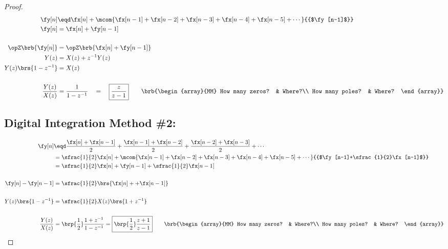 \begin{proof}
{\begin{align*}
  \fy[n]
    &\eqd \fx[n] + \mcom{\fx[n-1] + \fx[n-2] + \fx[n-3] + \fx[n-4] + \fx[n-5] + \cdots}{{$\fy[n-1]$}}
  \\
  \fy[n] &=    \fx[n] + \fy[n-1]
  \\\\
  \opZ\brb{\fy[n]} &= \opZ\brb{\fx[n] + \fy[n-1]}
  \\
  Y(z) &= X(z) + z^{-1}Y(z)
  \\
  Y(z)\brs{1-z^{-1}} &= X(z)
  \\\\
  \frac{Y(z)}{X(z)} &= \frac{1}{1-z^{-1}} \quad=\quad \boxed{\frac{z}{z-1}}
  \qquad\brb{\begin{array}{MM}
    How many zeros? & Where?\\
    How many poles? & Where?
  \end{array}}
\end{align*}}


\subsection{Digital Integration Method \#2: }
 
{\begin{align*}
  \fy[n]
    &\eqd \frac{\fx[n]+\fx[n-1]}{2} + \frac{\fx[n-1]+\fx[n-2]}{2} + \frac{\fx[n-2]+\fx[n-3]}{2} + \cdots
  \\&=    \sfrac{1}{2}\fx[n] + \mcom{\fx[n-1] + \fx[n-2] + \fx[n-3] + \fx[n-4] + \fx[n-5] + \cdots}{{$\fy[n-1]+\sfrac{1}{2}\fx[n-1]$}}
  \\&=    \sfrac{1}{2}\fx[n] + \fy[n-1]+\sfrac{1}{2}\fx[n-1]
  \\\\
  \fy[n]-\fy[n-1]&=    \sfrac{1}{2}\brs{\fx[n] + +\fx[n-1]} 
  \\\\
  Y(z)\brs{1-z^{-1}} &= \sfrac{1}{2} X(z)\brs{1+z^{-1}}
  \\\\
  \frac{Y(z)}{X(z)} 
    &= \brp{\frac{1}{2}} \frac{1+z^{-1}}{1-z^{-1}}
     = \boxed{\brp{\frac{1}{2}} \frac{z+1}{z-1}} 
  \qquad\brb{\begin{array}{MM}
    How many zeros? & Where?\\
    How many poles? & Where?
  \end{array}}
\end{align*}}


\end{proof}
